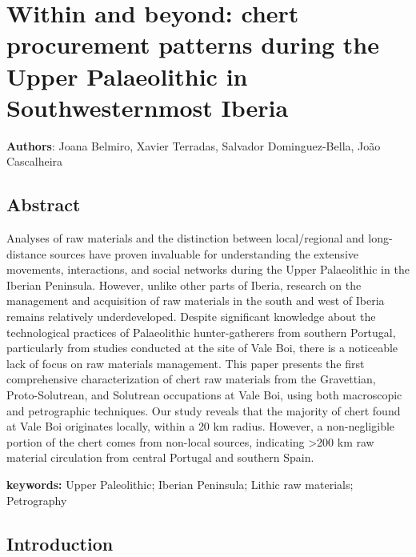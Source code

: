 \documentclass[
  a4paper,
  DIV=11,
  numbers=noendperiod]{scrreprt}
\begin{document}

\chapter{Within and beyond: chert procurement patterns during the Upper
Palaeolithic in Southwesternmost
Iberia}\label{within-and-beyond-chert-procurement-patterns-during-the-upper-palaeolithic-in-southwesternmost-iberia}

\textbf{Authors}: Joana Belmiro, Xavier Terradas, Salvador
Dominguez-Bella, João Cascalheira

\newpage

\section*{Abstract}\label{abstract-2}


Analyses of raw materials and the distinction between local/regional and
long-distance sources have proven invaluable for understanding the
extensive movements, interactions, and social networks during the Upper
Palaeolithic in the Iberian Peninsula. However, unlike other parts of
Iberia, research on the management and acquisition of raw materials in
the south and west of Iberia remains relatively underdeveloped. Despite
significant knowledge about the technological practices of Palaeolithic
hunter-gatherers from southern Portugal, particularly from studies
conducted at the site of Vale Boi, there is a noticeable lack of focus
on raw materials management. This paper presents the first comprehensive
characterization of chert raw materials from the Gravettian,
Proto-Solutrean, and Solutrean occupations at Vale Boi, using both
macroscopic and petrographic techniques. Our study reveals that the
majority of chert found at Vale Boi originates locally, within a 20 km
radius. However, a non-negligible portion of the chert comes from
non-local sources, indicating \textgreater200 km raw material
circulation from central Portugal and southern Spain.

\textbf{keywords:} Upper Paleolithic; Iberian Peninsula; Lithic raw
materials; Petrography

\newpage

\section{Introduction}\label{introduction-2}
\end{document}
